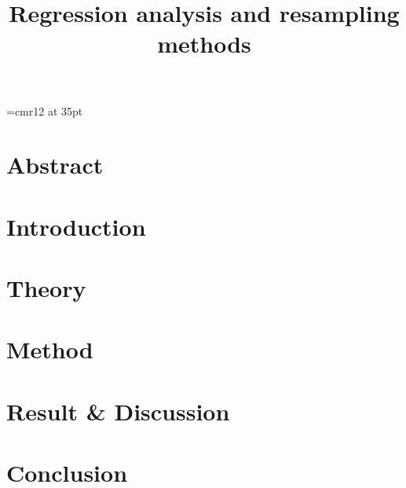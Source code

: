 
\font\myfont=cmr12 at 35pt
\title{\textbf{{\myfont Regression analysis and resampling methods}}}

\mnfrontpage


\pagestyle{fancy}
\fancyhf{}
\fancyfoot[CE,LO]{\leftmark}

\renewcommand{\headrulewidth}{2pt}
\renewcommand{\footrulewidth}{1pt}

\tableofcontents



\pagebreak
\pagebreak
\section*{Abstract}%

\cite{compphys}


\section{Introduction}



\section{Theory}\label{sec:theory}




\section{Method}




\section{Result \& Discussion}




%


\section{Conclusion}



